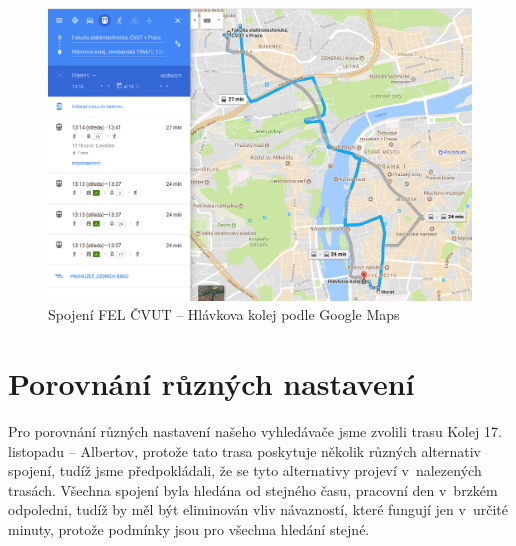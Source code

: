 \begin{figure}[h]
  \centering
    \includegraphics[width=\textwidth]{../img/fel-hlavkova-google.png}
  \caption{Spojení FEL ČVUT -- Hlávkova kolej podle Google Maps}
  \label{fig:fel-hlavkova-google}
\end{figure}

\clearpage
\section{Porovnání různých nastavení}
Pro porovnání různých nastavení našeho vyhledávače jsme zvolili trasu Kolej
17.\,listopadu -- Albertov, protože tato trasa poskytuje několik různých
alternativ spojení, tudíž jsme předpokládali, že se tyto alternativy projeví
v~nalezených trasách. Všechna spojení byla hledána od stejného času, pracovní den
v~brzkém odpoledni, tudíž by měl být eliminován vliv návazností, které fungují
jen v~určité minuty, protože podmínky jsou pro všechna hledání stejné.

